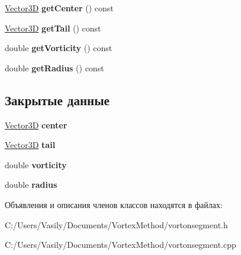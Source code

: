 \begin{DoxyCompactItemize}
\mbox{\hyperlink{class_vector3_d}{Vector3D}} {\bfseries get\+Center} () const
\item 
\mbox{\label{class_vorton_segment_a271a9e7352df20c59dae3588c6c5ca8a}} 
\mbox{\hyperlink{class_vector3_d}{Vector3D}} {\bfseries get\+Tail} () const
\item 
\mbox{\label{class_vorton_segment_ac0365bbe46da4a246983e4a0a2372693}} 
double {\bfseries get\+Vorticity} () const
\item 
\mbox{\label{class_vorton_segment_a1eaefb0b9c99dbea96a8aca0a55a2253}} 
double {\bfseries get\+Radius} () const
\end{DoxyCompactItemize}
\subsection*{Закрытые данные}
\begin{DoxyCompactItemize}
\item 
\mbox{\label{class_vorton_segment_af5211ad6a800dce706259692e4dcfd3c}} 
\mbox{\hyperlink{class_vector3_d}{Vector3D}} {\bfseries center}
\item 
\mbox{\label{class_vorton_segment_a154c6abfd4e84b3dc61e8e858875f172}} 
\mbox{\hyperlink{class_vector3_d}{Vector3D}} {\bfseries tail}
\item 
\mbox{\label{class_vorton_segment_ad188ebfca1a915471c81e10354233c7b}} 
double {\bfseries vorticity}
\item 
\mbox{\label{class_vorton_segment_a2e738e78518d9066b22e74d486389ff4}} 
double {\bfseries radius}
\end{DoxyCompactItemize}


Объявления и описания членов классов находятся в файлах\+:\begin{DoxyCompactItemize}
\item 
C\+:/\+Users/\+Vasily/\+Documents/\+Vortex\+Method/vortonsegment.\+h\item 
C\+:/\+Users/\+Vasily/\+Documents/\+Vortex\+Method/vortonsegment.\+cpp\end{DoxyCompactItemize}
